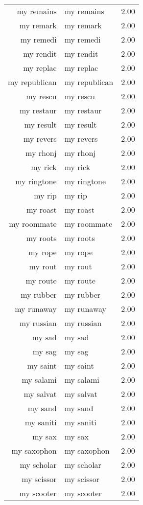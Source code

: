 \begin{table}[ht]
\begin{tabular}{rlr}
  my remains & my remains & 2.00 \\ 
  my remark & my remark & 2.00 \\ 
  my remedi & my remedi & 2.00 \\ 
  my rendit & my rendit & 2.00 \\ 
  my replac & my replac & 2.00 \\ 
  my republican & my republican & 2.00 \\ 
  my rescu & my rescu & 2.00 \\ 
  my restaur & my restaur & 2.00 \\ 
  my result & my result & 2.00 \\ 
  my revers & my revers & 2.00 \\ 
  my rhonj & my rhonj & 2.00 \\ 
  my rick & my rick & 2.00 \\ 
  my ringtone & my ringtone & 2.00 \\ 
  my rip & my rip & 2.00 \\ 
  my roast & my roast & 2.00 \\ 
  my roommate & my roommate & 2.00 \\ 
  my roots & my roots & 2.00 \\ 
  my rope & my rope & 2.00 \\ 
  my rout & my rout & 2.00 \\ 
  my route & my route & 2.00 \\ 
  my rubber & my rubber & 2.00 \\ 
  my runaway & my runaway & 2.00 \\ 
  my russian & my russian & 2.00 \\ 
  my sad & my sad & 2.00 \\ 
  my sag & my sag & 2.00 \\ 
  my saint & my saint & 2.00 \\ 
  my salami & my salami & 2.00 \\ 
  my salvat & my salvat & 2.00 \\ 
  my sand & my sand & 2.00 \\ 
  my saniti & my saniti & 2.00 \\ 
  my sax & my sax & 2.00 \\ 
  my saxophon & my saxophon & 2.00 \\ 
  my scholar & my scholar & 2.00 \\ 
  my scissor & my scissor & 2.00 \\ 
  my scooter & my scooter & 2.00 \\ 

\end{tabular}
\end{table}
